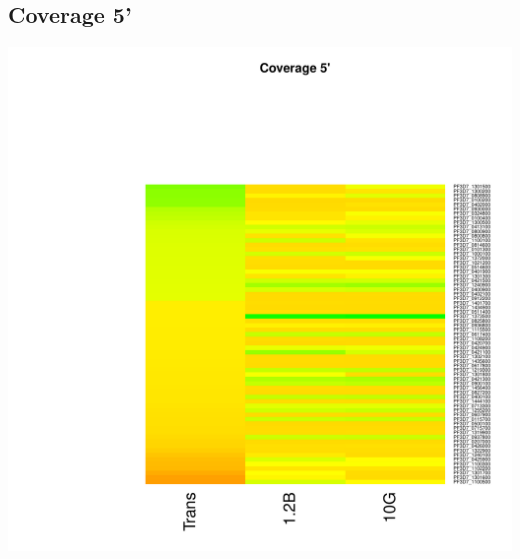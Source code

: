 \documentclass{article}\usepackage[]{graphicx}\usepackage[]{color}
\newenvironment{knitrout}{}{} %
\begin{document}
\subsection{Coverage 5'}
\begin{knitrout}
\color{fgcolor}

{\centering \includegraphics[width=.9\linewidth]{figure/minimal-heat_cov_tss-1} 

}



\end{knitrout}
\clearpage
\end{document}
